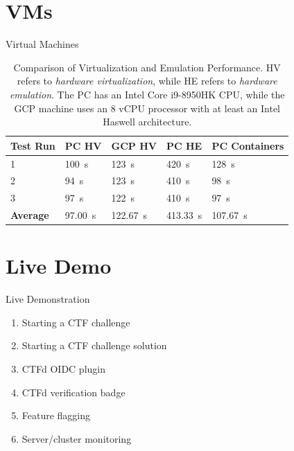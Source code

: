 \documentclass{beamer}
\begin{document}
\section{VMs}
\begin{frame}{Virtual Machines}
\begin{table}[h]
\centering
\begin{tabular}{|l|l|l|l|l|}
\hline
\textbf{Test Run} & \textbf{PC HV} & \textbf{GCP HV} & \textbf{PC HE} & \textbf{PC Containers} \\ \hline
1 & \SI{100}{\second} & \SI{123}{\second} & \SI{420}{\second} & \SI{128}{\second} \\ \hline
2 & \SI{94}{\second}  & \SI{123}{\second} & \SI{410}{\second} & \SI{98}{\second}  \\ \hline
3 & \SI{97}{\second}  & \SI{122}{\second} & \SI{410}{\second} & \SI{97}{\second}  \\ \hline \hline
\textbf{Average} & \SI{97.00}{\second} & \SI{122.67}{\second} & \SI{413.33}{\second} & \SI{107.67}{\second} \\ \hline
\end{tabular}
\caption{Comparison of Virtualization and Emulation Performance. HV refers to \textit{hardware virtualization}, while HE refers to \textit{hardware emulation}. The PC has an Intel Core i9-8950HK CPU, while the GCP machine uses an 8 vCPU processor with at least an Intel Haswell architecture.}
\label{table:performance}
\end{table}
\end{frame}

\section{Live Demo}
\begin{frame}{Live Demonstration}
    \begin{enumerate}
        \item Starting a CTF challenge
        \item Starting a CTF challenge solution
        \item CTFd OIDC plugin
        \item CTFd verification badge
        \item Feature flagging
        \item Server/cluster monitoring
    \end{enumerate}
\end{frame}
\end{document}
